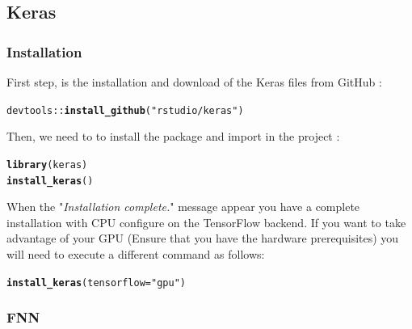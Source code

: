 \documentclass[letter,8pt]{article}\usepackage[]{graphicx}\usepackage[]{color}
\makeatletter
\newcommand{\hlstr}[1]{\textcolor[rgb]{0.192,0.494,0.8}{#1}}%
\newcommand{\hlopt}[1]{\textcolor[rgb]{0,0,0}{#1}}%
\newcommand{\hlstd}[1]{\textcolor[rgb]{0.345,0.345,0.345}{#1}}%
\newcommand{\hlkwc}[1]{\textcolor[rgb]{0.333,0.667,0.333}{#1}}%
\newcommand{\hlkwd}[1]{\textcolor[rgb]{0.737,0.353,0.396}{\textbf{#1}}}%
\newenvironment{kframe}{%
 \def\at@end@of@kframe{}%
 \ifinner\ifhmode%
  \def\at@end@of@kframe{\end{minipage}}%
  \begin{minipage}{\columnwidth}%
 \fi\fi%
 \def\FrameCommand##1{\hskip\@totalleftmargin \hskip-\fboxsep
 \colorbox{shadecolor}{##1}\hskip-\fboxsep
     \hskip-\linewidth \hskip-\@totalleftmargin \hskip\columnwidth}%
 \MakeFramed {\advance\hsize-\width
   \@totalleftmargin\z@ \linewidth\hsize
   \@setminipage}}%
 {\par\unskip\endMakeFramed%
 \at@end@of@kframe}
\newenvironment{knitrout}{}{} %
\makeatother
\begin{document}
\subsection{Keras}
\subsubsection{Installation}
First step, is the installation and download of the Keras files from GitHub :
\begin{knitrout}
\color{fgcolor}\begin{kframe}
\begin{alltt}
\hlstd{devtools}\hlopt{::}\hlkwd{install_github}\hlstd{(}\hlstr{"rstudio/keras"}\hlstd{)}
\end{alltt}
\end{kframe}
\end{knitrout}
Then, we need to to install the package and import in the project :
\begin{knitrout}
\color{fgcolor}\begin{kframe}
\begin{alltt}
\hlkwd{library}\hlstd{(keras)}
\hlkwd{install_keras}\hlstd{()}
\end{alltt}
\end{kframe}
\end{knitrout}
When the "\textit{Installation complete.}" message appear you have a complete installation with CPU configure on the TensorFlow backend.
If you want to take advantage of your GPU (Ensure that you have the hardware prerequisites) you will need to execute a different command as follows:
\begin{knitrout}
\color{fgcolor}\begin{kframe}
\begin{alltt}
\hlkwd{install_keras}\hlstd{(}\hlkwc{tensorflow} \hlstd{=} \hlstr{"gpu"}\hlstd{)}
\end{alltt}
\end{kframe}
\end{knitrout}
\subsubsection{FNN}
\end{document}
